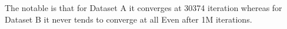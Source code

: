 \begin{answer}
\\ \\ 
The notable is that for Dataset A it converges at 30374 iteration whereas for Dataset B it never tends to converge at all Even after 1M iterations.
\\ \\
\end{answer}
